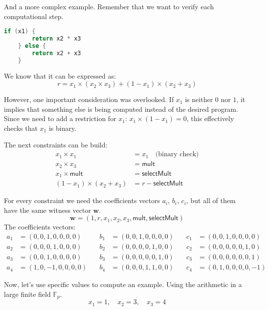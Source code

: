 \documentclass[../lecture-notes.tex]{subfiles}
\begin{document}
\begin{example}
    And a more complex example. Remember that we want to verify each computational step.

    \begin{lstlisting}[language=C,numbers=none]
    if (x1) {
        return x2 * x3
    } else {
        return x2 + x3
    }
    \end{lstlisting}

    We know that it can be expressed as:
    \[ r = x_1 \times (x_2 \times x_3) + (1 - x_1) \times (x_2 + x_3) \]

    However, one important consideration was overlooked. If $x_1$ is neither $0$ nor $1$, it implies
    that something else is being computed instead of the desired program. Since we need to add a
    restriction for $x_1$: $x_1 \times (1 - x_1) = 0$, this effectively checks that $x_1$ is binary.

    The next constraints can be build:
    \begin{align*}
        x_1 \times x_1 &= x_1 \quad \text{(binary check)} \tag{1} \\
        x_2 \times x_3 &= \mathsf{mult} \tag{2} \\
        x_1 \times \mathsf{mult} &= \mathsf{selectMult} \tag{3} \\
        (1 - x_1) \times (x_2 + x_3) &= r - \mathsf{selectMult} \tag{4}
    \end{align*}

    For every constraint we need the coefficients vectors $a_i$, $b_i$, $c_i$, but all of them have
    the same witness vector $\mathbf{w}$.
    \[ \mathbf{w} = (1, r, x_1, x_2, x_3, \mathsf{mult}, \mathsf{selectMult}) \]
    The coefficients vectors:
    \begin{align*}
        a_1 &= (0, 0, 1, 0, 0, 0, 0) & \quad b_1 &= (0, 0, 1, 0, 0, 0, 0) & \quad c_1 &= (0, 0, 1, 0, 0, 0, 0) \\
        a_2 &= (0, 0, 0, 1, 0, 0, 0) & \quad b_2 &= (0, 0, 0, 0, 1, 0, 0) & \quad c_2 &= (0, 0, 0, 0, 0, 1, 0) \\
        a_3 &= (0, 0, 1, 0, 0, 0, 0) & \quad b_3 &= (0, 0, 0, 0, 0, 1, 0) & \quad c_3 &= (0, 0, 0, 0, 0, 0, 1) \\
        a_4 &= (1, 0, -1, 0, 0, 0, 0) & \quad b_4 &= (0, 0, 0, 1, 1, 0, 0) & \quad c_4 &= (0, 1, 0, 0, 0, 0, -1)
    \end{align*}

    Now, let's use specific values to compute an example. Using the arithmetic in a large finite
    field $\mathbb{F}_p$.
    \[ x_1 = 1, \quad x_2 = 3, \quad x_3 = 4 \]


\end{example}
\end{document}
